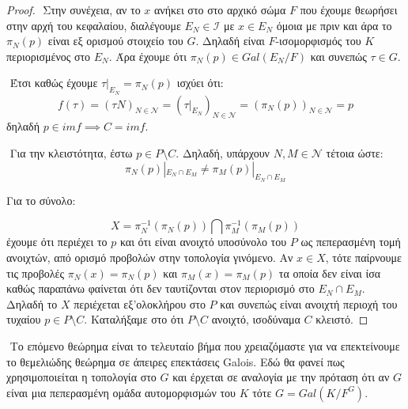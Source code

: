\documentclass[oneside,a4paper]{article}
\newcommand {\tl}{\textlatin}
\begin{document}
\begin{proof}
$ $\newline
\noindent Στην συνέχεια, αν το $x$ ανήκει στο στο αρχικό σώμα $F$ που έχουμε θεωρήσει στην αρχή του κεφαλαίου, διαλέγουμε $E_N \in \mathcal{I}$ με $x \in E_N$ όμοια με πριν και άρα το $\pi_N (p)$ είναι εξ ορισμού στοιχείο του $G$. Δηλαδή είναι $F$-ισομορφισμός του $K$ περιορισμένος στο $E_N$. Άρα έχουμε ότι $\pi_N (p) \in Gal(E_N/F)$ και συνεπώς $\tau \in G$.

$ $\newline
\noindent Έτσι καθώς έχουμε $\tau |_{E_N}=\pi_N (p)$ ισχύει ότι:
$$f(\tau) = (\tau N)_{N \in \mathcal{N}} = (\tau|_{E_N})_{N \in \mathcal{N}} = (\pi_N (p))_{N \in \mathcal{N}} = p$$
δηλαδή $p \in imf \implies C=imf$.

$ $\newline
\noindent Για την κλειστότητα, έστω $p \in P\setminus C$. Δηλαδή, υπάρχουν $N,M \in \mathcal{N}$ τέτοια ώστε:
$$\pi_N (p) |_{E_N \cap E_M} \neq \pi_M (p) |_{E_N \cap E_M}$$ 

\noindent Για το σύνολο:

$$X = \pi^{-1}_N \left(\pi_N \left( p \right) \right) \bigcap \pi^{-1}_M \left(\pi_M \left( p \right) \right)$$
έχουμε ότι περιέχει το $p$ και ότι είναι ανοιχτό υποσύνολο του $P$ ως πεπερασμένη τομή ανοιχτών, από ορισμό προβολών στην τοπολογία γινόμενο. Αν $x \in X$, τότε παίρνουμε τις προβολές $\pi_N(x) = \pi_N (p)$ και $\pi_M (x) = \pi_M (p)$ τα οποία δεν είναι ίσα καθώς παραπάνω φαίνεται ότι δεν ταυτίζονται στον περιορισμό στο $E_N \cap E_M$. Δηλαδή το $X$ περιέχεται εξ'ολοκλήρου στο $P$ και συνεπώς είναι ανοιχτή περιοχή του τυχαίου $p \in P\setminus C$. Καταλήξαμε στο ότι $P\setminus C$ ανοιχτό, ισοδύναμα $C$ κλειστό.
\end{proof}

$ $\newline
\noindent Το επόμενο θεώρημα είναι το τελευταίο βήμα που χρειαζόμαστε για να επεκτείνουμε το θεμελιώδης θεώρημα σε άπειρες επεκτάσεις \tl{Galois}. Εδώ θα φανεί πως χρησιμοποιείται η τοπολογία στο $G$ και έρχεται σε αναλογία με την πρόταση ότι αν $G$ είναι μια πεπερασμένη ομάδα αυτομορφισμών του $K$ τότε $G = Gal(K/F^G)$.
\end{document}
